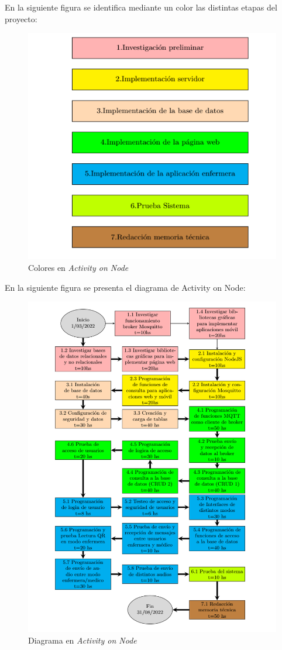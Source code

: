 \documentclass[
11pt, %
]{charter}
\begin{document}

En la siguiente figura se identifica mediante un color las distintas etapas del proyecto:

\begin{figure}[htpb]
\centering 
\includegraphics[width=.8\textwidth]{./Figuras/AoN-2.png}
\caption{Colores en \textit{Activity on Node}}
\label{fig:AoN}
\end{figure}
\newpage 
En la siguiente figura se presenta el diagrama de Activity on Node:
\begin{figure}[htpb]
\centering 
\includegraphics[width=.8\textwidth]{./Figuras/diagramaAoN.png}
\caption{Diagrama en \textit{Activity on Node}}
\label{fig:AoN}
\end{figure}
\end{document}
